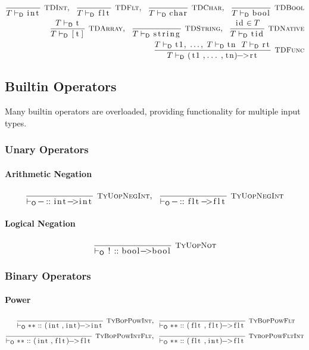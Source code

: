 \documentclass{article}
\newcommand{\code}[1]{\lstinline[columns=fixed]{#1}}
\newcommand{\drmrule}[5]{\frac{#1}{#2\vdash_{\mathsf{#3}}#4}\textsc{\ \small{#5}}}
\newcommand{\ruleapp}[1]{\vdash_{\mathsf{#1}}}
\newcommand{\mc}[1]{\textnormal{\code{#1}}}
\newcommand{\subsubsubsection}{\paragraph}
\begin{document}
				\begin{align*}
					\drmrule{}{T}{D}{\mc{int}}{TDInt},\ \ \drmrule{}{T}{D}{\mc{flt}}{TDFlt},\ \ 
					\drmrule{}{T}{D}{\mc{char}}{TDChar},\ \ \drmrule{}{T}{D}{\mc{bool}}{TDBool}\\
					\drmrule{T\ruleapp{D}\mc{t}}{T}{D}{\mc{[t]}}{TDArray},\ \ \drmrule{}{T}{D}{\mc{string}}{TDString},\ \ 
					\drmrule{\mc{id}\in T}{T}{D}{\mc{tid}}{TDNative}\\
					\drmrule{T\ruleapp{D}\mc{t1},\ \dots,\ T\ruleapp{D}\mc{tn}\ \ T\ruleapp{D}\mc{rt}}{T}{D}{\mc{(t1,...,tn)->rt}}{TDFunc}
				\end{align*}
		
		\subsection{Builtin Operators}
		
			Many builtin operators are overloaded, providing functionality for multiple input types.
			
			\subsubsection{Unary Operators}
			
				\subsubsubsection{Arithmetic Negation}
				
					\begin{align*}
						\drmrule{}{}{O}{\mc{-} :: \mc{int->int}}{TyUopNegInt},\ \ 
						\drmrule{}{}{O}{\mc{-} :: \mc{flt->flt}}{TyUopNegInt}
					\end{align*}
				
				\subsubsubsection{Logical Negation}

					\begin{align*}
						\drmrule{}{}{O}{\mc{!} :: \mc{bool->bool}}{TyUopNot}
					\end{align*}
			
			\subsubsection{Binary Operators}
			
				\subsubsubsection{Power}
				
					\begin{align*}
						\drmrule{}{}{O}{\mc{**} :: \mc{(int,int)->int}}{TyBopPowInt},\ \ &
						\drmrule{}{}{O}{\mc{**} :: \mc{(flt,flt)->flt}}{TyBopPowFlt}\\
						\drmrule{}{}{O}{\mc{**} :: \mc{(int,flt)->flt}}{TyBopPowIntFlt},\ \ &
						\drmrule{}{}{O}{\mc{**} :: \mc{(flt,int)->flt}}{TybopPowFltInt}
					\end{align*}
				
\end{document}
